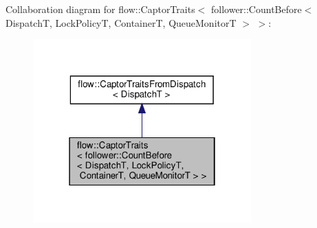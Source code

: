 Collaboration diagram for flow\+:\+:Captor\+Traits$<$ follower\+:\+:Count\+Before$<$ DispatchT, Lock\+PolicyT, ContainerT, Queue\+MonitorT $>$ $>$\+:
\nopagebreak
\begin{figure}[H]
\begin{center}
\leavevmode
\includegraphics[width=238pt]{structflow_1_1_captor_traits_3_01follower_1_1_count_before_3_01_dispatch_t_00_01_lock_policy_t_0820a9c27addcee2bc74a2035c4799b6d}
\end{center}
\end{figure}
